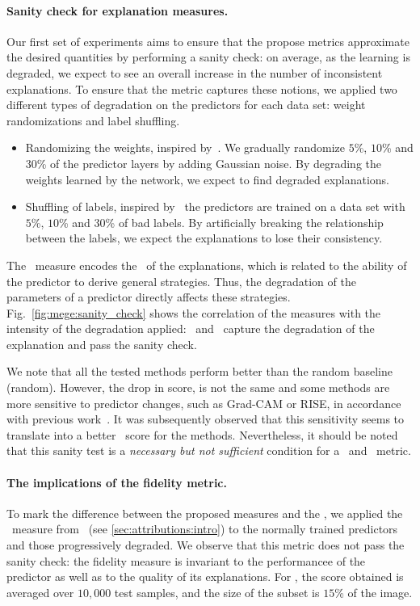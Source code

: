 \paragraph{Sanity check for explanation measures.} Our first set of experiments aims to ensure that the propose metrics approximate the desired quantities by performing a sanity check: on average, as the learning is degraded, we expect to see an overall increase in the number of inconsistent explanations.
To ensure that the metric captures these notions, we applied two different types of degradation on the predictors for each data set: weight randomizations and label shuffling.
\begin{itemize}
\setlength\itemsep{-0.2em}
\item Randomizing the weights, inspired by~\cite{adebayo2018sanity}. We gradually randomize $5$\%, $10$\% and $30$\% of the predictor layers by adding Gaussian noise. By degrading the weights learned by the network, we expect to find degraded explanations. 
\item Shuffling of labels, inspired by~\cite{neyshabur2017exploring, adebayo2018sanity} the predictors are trained on a data set with $5$\%, $10$\% and $30$\% of bad labels. By artificially breaking the relationship between the labels, we expect the explanations to lose their consistency.
\end{itemize}

The \mege~measure encodes the \representativity~of the explanations, which is related to the ability of the predictor to derive general strategies. 
Thus, the degradation of the parameters of a predictor directly affects these strategies.
Fig.~\ref{fig:mege:sanity_check} shows the correlation of the measures with the intensity of the degradation applied: \mege~and \reco~capture the degradation of the explanation and pass the sanity check.

We note that all the tested methods perform better than the random baseline (random). However, the drop in score, is not the same and some methods are more sensitive to predictor changes, such as Grad-CAM or RISE, in accordance with previous work~\cite{adebayo2018sanity, sixt2020explanations}. 
It was subsequently observed that this sensitivity seems to translate into a better \fidelity~score for the methods.
Nevertheless, it should be noted that this sanity test is a \textit{necessary but not sufficient} condition for a \representativity~and \consistency~metric.

\paragraph{The implications of the fidelity metric.} To mark the difference between the proposed measures and the \fidelity, we applied the \muf~measure from~\cite{aggregating2020} (see \autoref{sec:attributions:intro}) to the normally trained predictors and those progressively degraded. We observe that this metric does not pass the sanity check: the fidelity measure is invariant to the performancee of the predictor as well as to the quality of its explanations. For \muf, the score obtained is averaged over $10,000$ test samples, and the size of the subset is $15$\% of the image.

